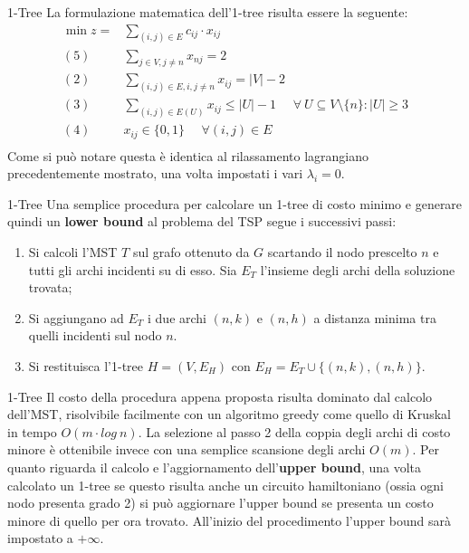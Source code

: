 \documentclass[10pt]{beamer}
\begin{document}
\begin{frame}{1-Tree}
    La formulazione matematica dell'1-tree risulta essere la seguente:
\begin{equation*}
    \begin{split}
        \min z = & \sum_{(i,j) \in E} c_{ij} \cdot x_{ij}\\
        (5)\:\:\:\:\:\: & \sum_{j \in V, j \neq n} x_{nj} = 2 \\
        (2) \:\:\:\:\:\: & \sum_{(i,j)\in E, i, j \neq n} x_{ij} = |V|-2 \\
        (3) \:\:\:\:\:\: & \sum_{(i,j) \in E(U)} x_{ij} \leq |U| - 1 \:\:\:\:\:\: \forall\: U \subseteq V\setminus\{n\} : |U| \geq 3 \\
        (4) \:\:\:\:\:\: & x_{ij} \in \{0,1\} \:\:\:\:\:\: \forall (i,j) \in E\\
    \end{split}
\end{equation*}
Come si può notare questa è identica al rilassamento lagrangiano precedentemente mostrato, una volta impostati i vari $\lambda_i = 0$.
\end{frame}

\begin{frame}{1-Tree}
    Una semplice procedura per calcolare un 1-tree di costo minimo e generare quindi un \textbf{lower bound} al problema del TSP segue i successivi passi:
    \begin{enumerate}[<+->]
        \item Si calcoli l'MST $T$ sul grafo ottenuto da $G$ scartando il nodo prescelto $n$ e tutti gli archi incidenti su di esso. Sia $E_T$ l'insieme degli archi della soluzione trovata;
        \item Si aggiungano ad $E_T$ i due archi $(n,k)$ e $(n,h)$ a distanza minima tra quelli incidenti sul nodo $n$.
        \item Si restituisca l'1-tree $H = (V, E_H)$ con $E_H = E_T \cup \{(n,k),(n,h)\}$.
    \end{enumerate}
\end{frame}

\begin{frame}{1-Tree}
    Il costo della procedura appena proposta risulta dominato dal calcolo dell'MST, risolvibile facilmente con un algoritmo greedy come quello di  Kruskal in tempo $O(m\cdot log\: n)$. La selezione al passo 2 della coppia degli archi di costo minore è ottenibile invece con una semplice scansione degli archi $O(m)$.
    \newline
    \newline
    Per quanto riguarda il calcolo e l'aggiornamento dell'\textbf{upper bound}, una volta calcolato un 1-tree se questo risulta anche un circuito hamiltoniano (ossia ogni nodo presenta grado 2) si può aggiornare l'upper bound se presenta un costo minore di quello per ora trovato. All'inizio del procedimento l'upper bound sarà impostato a $ + \infty$. 
\end{frame}
\end{document}
